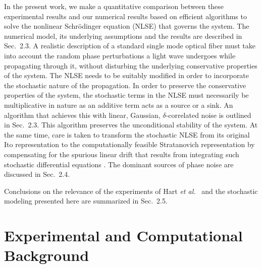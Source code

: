 In the present work, we make a quantitative comparison between these 
experimental results and our numerical results based on efficient algorithms 
\cite{Agrawal2} to solve the nonlinear Schr\"odinger equation (NLSE) that
governs the system. The numerical model, its underlying assumptions and
the results are described in Sec.\ 2.3. A realistic description of a 
standard single mode optical fiber must take into account the random phase 
perturbations a light wave undergoes while propagating through it, without 
disturbing the underlying conservative properties of the system. The NLSE 
needs to be suitably modified in order to incorporate the stochastic nature 
of the propagation. In order to preserve the conservative properties of the 
system, the stochastic terms in the NLSE must necessarily be multiplicative in 
nature as an additive term acts as a source or a sink. An algorithm that 
achieves this with linear, Gaussian, $\delta$-correlated noise is outlined in 
Sec.\ 2.3. This algorithm preserves the unconditional stability of the 
system. At the same time, care is taken to transform the stochastic NLSE from 
its original Ito representation \cite{ito} to the computationally feasible Stratanovich 
representation \cite{stratanovich} by compensating for the 
spurious linear drift that results from integrating such stochastic 
differential equations \cite{risken,werner2,drummond1,carter3}. The dominant 
sources of phase noise are discussed in Sec.\ 2.4. 

Conclusions on the relevance of the experiments of Hart {\it et al.}\ \cite{hart1} 
and the stochastic modeling presented here are summarized in Sec.\ 2.5.    

\section{Experimental and Computational Background}

